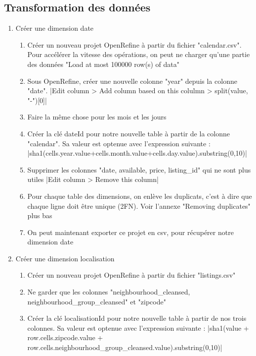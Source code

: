 \documentclass[11pt, a4paper]{article}
\begin{document}
\subsection{Transformation des données}
\begin{enumerate}
   \item Créer une dimension date
   \begin{enumerate}[label=\roman*.]
      \item Créer un nouveau projet OpenRefine à partir du fichier \spverb"calendar.csv". Pour accélérer la vitesse des opérations, on peut ne charger qu'une partie des données \spverb"Load at most 100000 row(s) of data"
      \item Sous OpenRefine, créer une nouvelle colonne \spverb"year" depuis la colonne \spverb"date". \spverb|Edit column > Add column based on this colulmn > split(value, "-")[0]|
      \item Faire la même chose pour les mois et les jours
      \item Créer la clé dateId pour notre nouvelle table à partir de la colonne \spverb"calendar". Sa valeur est optenue avec l'expression suivante : \\ \spverb|sha1(cells.year.value+cells.month.value+cells.day.value).substring(0,10)|
      \item Supprimer les colonnes \spverb"date, available, price, listing_id" qui ne sont plus utiles \spverb|Edit column > Remove this column|
      \item Pour chaque table des dimensions, on enlève les duplicats, c'est à dire que chaque ligne doit être unique (2FN). Voir l'annexe \spverb"Removing duplicates" plus bas
      \item On peut maintenant exporter ce projet en csv, pour récupérer notre dimension date
   \end{enumerate}
   \item Créer une dimension localisation
   \begin{enumerate}[label=\roman*.]
      \item Créer un nouveau projet OpenRefine à partir du fichier \spverb"listings.csv"
      \item Ne garder que les colonnes \spverb"neighbourhood_cleansed, neighbourhood_group_cleansed" et \spverb"zipcode"
      \item Créer la clé localisationId pour notre nouvelle table à partir de nos trois colonnes. Sa valeur est optenue avec l'expression suivante : \spverb|sha1(value + row.cells.zipcode.value + row.cells.neighbourhood_group_cleansed.value).substring(0,10)|

\end{enumerate}
\end{enumerate}
\end{document}
